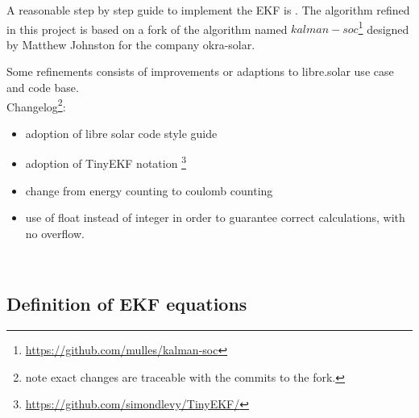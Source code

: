 A reasonable step by step guide to implement the EKF is \cite{rzepka2021implementing}. The algorithm refined in this project is based on a fork of the algorithm named $kalman-soc$\footnote{ \url{https://github.com/mulles/kalman-soc}} designed by Matthew Johnston for the company okra-solar. 

Some refinements consists of improvements or adaptions to libre.solar use case and code base.
 \\




Changelog\footnote{note exact changes are traceable with the commits to the fork. 
}: 

\begin{itemize}
\item adoption of libre solar code style guide 

\item adoption of TinyEKF notation  \footnote{\url{https://github.com/simondlevy/TinyEKF/}} 
\item change from energy counting to coulomb counting

\item use of float instead of integer in order to guarantee correct calculations, with no overflow. 

\end{itemize}


\
\
\

\pagebreak

\subsection{Definition of EKF equations}
\label{System's dynamic model}


%

